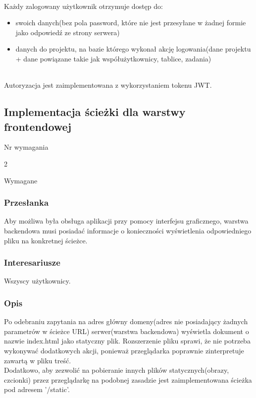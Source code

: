 \documentclass[eng,printmode]{mgr}
\begin{document}
\ \\
Każdy zalogowany użytkownik otrzymuje dostęp do:
\begin{itemize}
  \item[--] swoich danych(bez pola password, które nie jest przesyłane w żadnej formie jako odpowiedź ze strony serwera)
  \item[--] danych do projektu, na bazie którego wykonał akcję logowania(dane projektu + dane powiązane takie jak współużytkownicy, tablice, zadania)
\end{itemize}
\ \\
Autoryzacja jest zaimplementowana z wykorzystaniem tokenu JWT\cite{Keyword_JWTToken}.

\subsection{Implementacja ścieżki dla warstwy frontendowej}
\begin{labeling}{Nr wymagania}
\item [Nr wymagania:] 2
\item [Priorytet:] Wymagane
\end{labeling}

\subsubsection{Przesłanka}
Aby możliwa była obsługa aplikacji przy pomocy interfejsu graficznego, warstwa backendowa musi posiadać informacje o konieczności wyświetlenia odpowiedniego pliku na konkretnej ścieżce.


\subsubsection{Interesariusze}
Wszyscy użytkownicy.

\subsubsection{Opis}
Po odebraniu zapytania na adres główny domeny(adres nie posiadający żadnych parametrów w ścieżce URL) serwer(warstwa backendowa) wyświetla dokument o nazwie index.html jako statyczny plik. Rozszerzenie pliku sprawi, że nie potrzeba wykonywać dodatkowych akcji, ponieważ przeglądarka poprawnie zinterpretuje zawartą w pliku treść. \\
Dodatkowo, aby zezwolić na pobieranie innych plików statycznych(obrazy, czcionki) przez przeglądarkę na podobnej zasadzie jest zaimplementowana ścieżka pod adresem '/static'.
\end{document}
